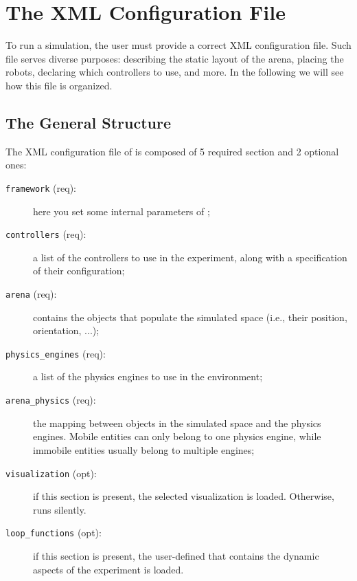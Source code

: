 \lstset{
  language=XML,
  basicstyle=\footnotesize,
  frame=leftline,
  xleftmargin=1em,
  framexleftmargin=0.3em,
  framerule=2pt
}

\chapter{The XML Configuration File}
To run a simulation, the user must provide a correct XML configuration
file. Such file serves diverse purposes: describing the static layout
of the arena, placing the robots, declaring which controllers to use,
and more. In the following we will see how this file is organized.

\section{The General Structure}
The XML configuration file of \argos is composed of 5 required section
and 2 optional ones:
\begin{description}
\item[\texttt{framework} (req):] here you set some internal parameters of \argos;
\item[\texttt{controllers} (req):] a list of the controllers to use in the
  experiment, along with a specification of their configuration;
\item[\texttt{arena} (req):] contains the objects that populate the simulated
  space (i.e., their position, orientation, ...);
\item[\texttt{physics\_engines} (req):] a list of the physics engines to use in
  the environment;
\item[\texttt{arena\_physics} (req):] the mapping between objects in the
  simulated space and the physics engines. Mobile entities can only
  belong to one physics engine, while immobile entities usually belong
  to multiple engines;
\item[\texttt{visualization} (opt):] if this section is present, the selected
  visualization is loaded. Otherwise, \argos runs silently.
\item[\texttt{loop\_functions} (opt):] if this section is present, the
  user-defined that contains the dynamic aspects of the experiment is
  loaded.
\end{description}

